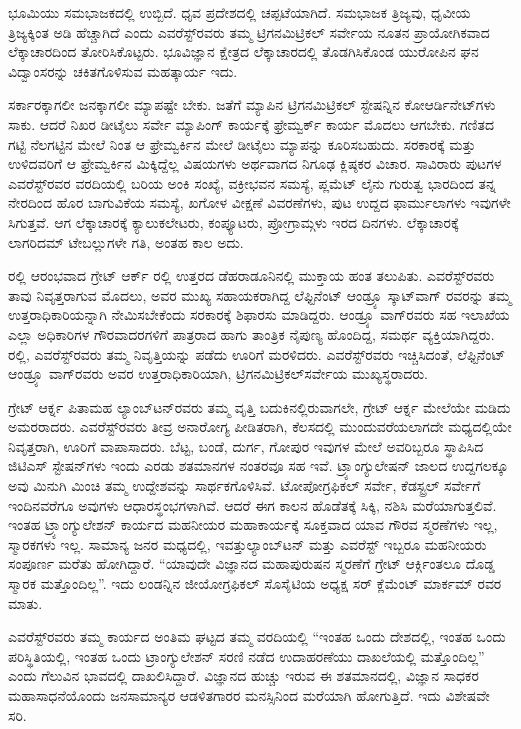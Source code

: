 ಭೂಮಿಯು ಸಮಭಾಜಕದಲ್ಲಿ ಉಬ್ಬಿದೆ. ಧೃವ ಪ್ರದೇಶದಲ್ಲಿ ಚಪ್ಪಟೆಯಾಗಿದೆ. ಸಮಭಾಜಕ ತ್ರಿಜ್ಯವು, ಧೃವೀಯ ತ್ರಿಜ್ಯಕ್ಕಿಂತ  ಅಡಿ ಹೆಚ್ಚಾಗಿದೆ ಎಂದು ಎವರೆಸ್ಟ್​ರವರು ತಮ್ಮ ಟ್ರಿಗನಮಿಟ್ರಿಕಲ್​ ಸರ್ವೇಯ ನೂತನ ಪ್ರಾಯೋಗಿಕವಾದ ಲೆಕ್ಕಾಚಾರದಿಂದ ತೋರಿಸಿಕೊಟ್ಟರು. ಭೂವಿಜ್ಞಾನ ಕ್ಷೇತ್ರದ ಲೆಕ್ಕಾಚಾರದಲ್ಲಿ ತೊಡಗಿಸಿಕೊಂಡ ಯುರೋಪಿನ ಘನ ವಿದ್ವಾಂಸರನ್ನು ಚಕಿತಗೊಳಿಸುವ ಮಹತ್ಕಾರ್ಯ ಇದು.

ಸರ್ಕಾರಕ್ಕಾಗಲೀ ಜನಕ್ಕಾಗಲೀ ಮ್ಯಾಪಷ್ಟೇ ಬೇಕು. ಜತೆಗೆ ಮ್ಯಾಪಿನ ಟ್ರಿಗನಮಿಟ್ರಿಕಲ್​ ಸ್ಟೇಷನ್ನಿನ ಕೋಆರ್ಡಿನೇಟ್​ಗಳು ಸಾಕು. ಆದರೆ ನಿಖರ ಡೀಟೈಲು ಸರ್ವೇ ಮ್ಯಾಪಿಂಗ್​ ಕಾರ್ಯಕ್ಕೆ ಫ್ರೇಮ್ವರ್ಕ್ ಕಾರ್ಯ ಮೊದಲು ಆಗಬೇಕು. ಗಣಿತದ ಗಟ್ಟಿ ನೆಲಗಟ್ಟಿನ ಮೇಲೆ ನಿಂತ ಆ ಫ್ರೇಮ್ವರ್ಕಿನ ಮೇಲೆ ಡೀಟೈಲು ಮ್ಯಾಪನ್ನು ಕೂರಿಸಬಹುದು. ಸರಕಾರಕ್ಕೆ ಮತ್ತು ಉಳಿದವರಿಗೆ ಆ ಫ್ರೇಮ್ವರ್ಕಿನ ಮಿಕ್ಕಿದ್ದೆಲ್ಲ ವಿಷಯಗಳು ಅರ್ಥವಾಗದ ನಿಗೂಢ ಕ್ಲಿಷ್ಠಕರ ವಿಚಾರ. ಸಾವಿರಾರು ಪುಟಗಳ ಎವರೆಸ್ಟ್​ರವರ ವರದಿಯಲ್ಲಿ ಬರಿಯ ಅಂಕಿ ಸಂಖ್ಯೆ, ವಕ್ರೀಭವನ ಸಮಸ್ಯೆ, ಪ್ಲಮೆಟ್​ ಲೈನು ಗುರುತ್ವ ಭಾರದಿಂದ ತನ್ನ ನೇರದಿಂದ ಹೊರ ಬಾಗುವಿಕೆಯ ಸಮಸ್ಯೆ, ಖಗೋಳ ವೀಕ್ಷಣೆ ವಿವರಣೆಗಳು, ಪುಟ ಉದ್ದದ ಫಾರ್ಮುಲಾಗಳು ಇವುಗಳೇ ಸಿಗುತ್ತವೆ. ಆಗ ಲೆಕ್ಕಾಚಾರಕ್ಕೆ ಕ್ಯಾಲುಕಲೇಟರು, ಕಂಪ್ಯೂಟರು, ಪ್ರೋಗ್ರಾಮ್ಗಳು ಇರದ ದಿನಗಳು. ಲೆಕ್ಕಾಚಾರಕ್ಕೆ ಲಾಗರಿದಮ್ ಟೇಬಲ್ಲುಗಳೇ ಗತಿ, ಅಂತಹ ಕಾಲ ಅದು.

ರಲ್ಲಿ ಆರಂಭವಾದ ಗ್ರೇಟ್​ ಆರ್ಕ್ ರಲ್ಲಿ ಉತ್ತರದ ಡೆಹರಾಡೂನಿನಲ್ಲಿ ಮುಕ್ತಾಯ ಹಂತ ತಲುಪಿತು. ಎವರೆಸ್ಟ್​ರವರು ತಾವು ನಿವೃತ್ತರಾಗುವ ಮೊದಲು, ಅವರ ಮುಖ್ಯ ಸಹಾಯಕರಾಗಿದ್ದ ಲೆಫ್ಟಿನೆಂಟ್​ ಆಂಡ್ರ್ಯೂ ಸ್ಕಾಟ್​ ವಾಗ್​ ರವರನ್ನು ತಮ್ಮ ಉತ್ತರಾಧಿಕಾರಿಯನ್ನಾಗಿ ನೇಮಿಸಬೇಕೆಂದು ಸರಕಾರಕ್ಕೆ ಶಿಫಾರಸು ಮಾಡಿದ್ದರು. ಆಂಡ್ರ್ಯೂ ವಾಗ್​ರವರು ಸಹ ಇಲಾಖೆಯ ಎಲ್ಲಾ ಅಧಿಕಾರಿಗಳ ಗೌರವಾದರಗಳಿಗೆ ಪಾತ್ರರಾದ ಹಾಗು ತಾಂತ್ರಿಕ ನೈಪುಣ್ಯ ಹೊಂದಿದ್ದ, ಸಮರ್ಥ ವ್ಯಕ್ತಿಯಾಗಿದ್ದರು.  ರಲ್ಲಿ, ಎವರೆಸ್ಟ್​ರವರು ತಮ್ಮ ನಿವೃತ್ತಿಯನ್ನು ಪಡೆದು ಊರಿಗೆ ಮರಳಿದರು. ಎವರೆಸ್ಟ್​ರವರು ಇಚ್ಚಿಸಿದಂತೆ, ಲೆಫ್ಟಿನೆಂಟ್​ ಆಂಡ್ರ್ಯೂ ವಾಗ್​ರವರು ಅವರ ಉತ್ತರಾಧಿಕಾರಿಯಾಗಿ, ಟ್ರಿಗನಮಿಟ್ರಿಕಲ್​ ಸರ್ವೇಯ ಮುಖ್ಯಸ್ಥರಾದರು.

ಗ್ರೇಟ್​ ಆರ್ಕ್ನ ಪಿತಾಮಹ ಲ್ಯಾಂಬ್​ಟನ್​ರವರು ತಮ್ಮ ವೃತ್ತಿ ಬದುಕಿನಲ್ಲಿರುವಾಗಲೇ, ಗ್ರೇಟ್​ ಆರ್ಕ್ನ ಮೇಲೆಯೇ ಮಡಿದು ಅಮರರಾದರು. ಎವರೆಸ್ಟ್​ರವರು ತೀವ್ರ ಅನಾರೋಗ್ಯ ಪೀಡಿತರಾಗಿ, ಕೆಲಸದಲ್ಲಿ ಮುಂದುವರೆಯಲಾಗದೇ ಮಧ್ಯದಲ್ಲಿಯೇ ನಿವೃತ್ತರಾಗಿ, ಊರಿಗೆ ವಾಪಾಸಾದರು. ಬೆಟ್ಟ, ಬಂಡೆ, ದುರ್ಗ, ಗೋಪುರ ಇವುಗಳ ಮೇಲೆ ಅವರಿಬ್ಬರೂ ಸ್ಥಾಪಿಸಿದ ಜಿಟಿಎಸ್​ ಸ್ಟೇಷನ್​ಗಳು ಇಂದು ಎರಡು ಶತಮಾನಗಳ ನಂತರವೂ ಸಹ ಇವೆ. ಟ್ರ್ಯಾಂಗ್ಯುಲೇಷನ್​ ಜಾಲದ ಉದ್ದಗಲಕ್ಕೂ ಅವು ಮಿನುಗಿ ಮಿಂಚಿ ತಮ್ಮ ಉದ್ದೇಶವನ್ನು ಸಾರ್ಥಕಗೊಳಿಸಿವೆ. ಟೋಪೋಗ್ರಫಿಕಲ್​ ಸರ್ವೇ, ಕೆಡಸ್ಟ್ರಲ್​ ಸರ್ವೇಗೆ ಇಂದಿನವರೆಗೂ ಅವುಗಳು ಆಧಾರಸ್ಥಂಭಗಳಾಗಿವೆ. ಆದರೆ ಈಗ ಕಾಲನ ಹೊಡೆತಕ್ಕೆ ಸಿಕ್ಕಿ, ನಶಿಸಿ ಮರೆಯಾಗುತ್ತಲಿವೆ. ಇಂತಹ ಟ್ರ್ಯಾಂಗ್ಯುಲೇಶನ್​ ಕಾರ್ಯದ ಮಹನೀಯರ ಮಹಾಕಾರ್ಯಕ್ಕೆ ಸೂಕ್ತವಾದ ಯಾವ ಗೌರವ ಸ್ಮರಣೆಗಳು ಇಲ್ಲ, ಸ್ಮಾರಕಗಳು ಇಲ್ಲ. ಸಾಮಾನ್ಯ ಜನರ ಮಧ್ಯದಲ್ಲಿ, ಇವತ್ತು\break ಲ್ಯಾಂಬ್​ಟನ್​ ಮತ್ತು ಎವರೆಸ್ಟ್​ ಇಬ್ಬರೂ ಮಹನೀಯರು ಸಂಪೂರ್ಣ ಮರೆತು ಹೋಗಿದ್ದಾರೆ. “ಯಾವುದೇ ವಿಜ್ಞಾನದ ಮಹಾಪುರುಷನ ಸ್ಮರಣೆಗೆ ಗ್ರೇಟ್​ ಆರ್ಕ್ಗಿಂತಲೂ ದೊಡ್ಡ ಸ್ಮಾರಕ ಮತ್ತೊಂದಿಲ್ಲ”. ಇದು ಲಂಡನ್ನಿನ ಜೀಯೋಗ್ರಫಿಕಲ್​ ಸೊಸೈಟಿಯ ಅಧ್ಯಕ್ಷ ಸರ್​ ಕ್ಲೆಮೆಂಟ್​ ಮಾರ್ಕಮ್ ರವರ ಮಾತು.

ಎವರೆಸ್ಟ್​ರವರು ತಮ್ಮ ಕಾರ್ಯದ ಅಂತಿಮ ಘಟ್ಟದ ತಮ್ಮ ವರದಿಯಲ್ಲಿ “ಇಂತಹ ಒಂದು ದೇಶದಲ್ಲಿ, ಇಂತಹ ಒಂದು ಪರಿಸ್ಥಿತಿಯಲ್ಲಿ, ಇಂತಹ ಒಂದು ಟ್ರಾಂಗ್ಯುಲೇಶನ್​ ಸರಣಿ ನಡೆದ ಉದಾಹರಣೆಯು ದಾಖಲೆಯಲ್ಲಿ ಮತ್ತೊಂದಿಲ್ಲ” ಎಂದು ಗೆಲುವಿನ ಭಾವದಲ್ಲಿ ದಾಖಲಿಸಿದ್ದಾರೆ. ವಿಜ್ಞಾನದ ಹುಚ್ಚು ಇರುವ ಈ ಶತಮಾನದಲ್ಲಿ, ವಿಜ್ಞಾನ ಸಾಧಕರ ಮಹಾಸಾಧನೆಯೊಂದು ಜನಸಾಮಾನ್ಯರ ಆಡಳಿತಗಾರರ ಮನಸ್ಸಿನಿಂದ ಮರೆಯಾಗಿ ಹೋಗುತ್ತಿದೆ. ಇದು ವಿಶೇಷವೇ ಸರಿ.


